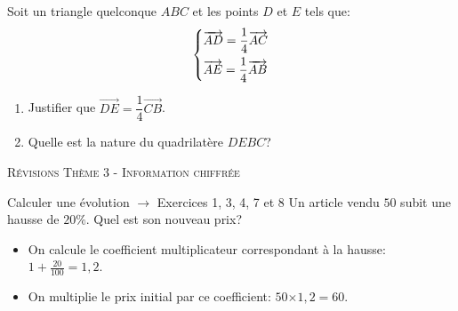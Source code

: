\documentclass[a4paper]{article}
\renewcommand\euro{\officialeuro\xspace}
\begin{document}
  \begin{exercice}{}{}
      Soit un triangle quelconque $ABC$ et les points $D$ et $E$ tels que:
      $$\begin{dcases}
        \overrightarrow{AD}=\dfrac{1}{4}\overrightarrow{AC} \\
        \overrightarrow{AE}=\dfrac{1}{4}\overrightarrow{AB}
      \end{dcases}$$
  \begin{enumerate}
      \item Justifier que  $\overrightarrow{DE}=\dfrac{1}{4}\overrightarrow{CB}$.
      \item Quelle est la nature du quadrilatère $DEBC$?
  \end{enumerate}  
  
      
  \end{exercice}
  
  
  \pagebreak
  

  

\begin{center}
    {\scshape\LARGE Révisions Thème 3 - Information chiffrée\par}
    \vspace{0.5cm}
  \end{center}
  

  \begin{methode*}[sidebyside, righthand width=2.2cm,segmentation code={}]{Calculer une évolution $\longrightarrow$ Exercices 1, 3, 4, 7 et 8}{}
     Un article vendu $50$\euro subit une hausse de $20\%$. Quel est son nouveau prix?

     \begin{itemize}
      \item On calcule le coefficient multiplicateur correspondant à la hausse: $1 + \frac{20}{100} = 1,2$.
      \item On multiplie le prix initial par ce coefficient: $50$\euro$ \times 1,2 = 60$\euro.
     \end{itemize}
    \tcblower
  \end{methode*}
  
\end{document}
